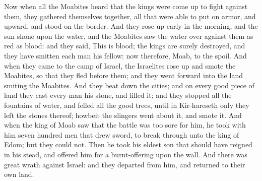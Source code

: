  Now when all the Moabites heard that the kings were come up to fight against them, they gathered themselves together, all that were able to put on armor, and upward, and stood on the border. And they rose up early in the morning, and the sun shone upon the water, and the Moabites saw the water over against them as red as blood: and they said, This is blood; the kings are surely destroyed, and they have smitten each man his fellow: now therefore, Moab, to the spoil. And when they came to the camp of Israel, the Israelites rose up and smote the Moabites, so that they fled before them; and they went forward into the land smiting the Moabites. And they beat down the cities; and on every good piece of land they cast every man his stone, and filled it; and they stopped all the fountains of water, and felled all the good trees, until in Kir-hareseth only they left the stones thereof; howbeit the slingers went about it, and smote it. And when the king of Moab saw that the battle was too sore for him, he took with him seven hundred men that drew sword, to break through unto the king of Edom; but they could not. Then he took his eldest son that should have reigned in his stead, and offered him for a burnt-offering upon the wall. And there was great wrath against Israel: and they departed from him, and returned to their own land. 

